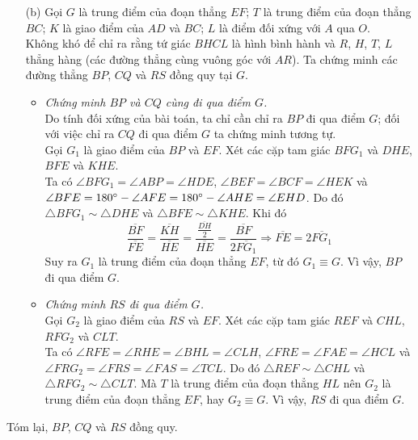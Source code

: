 \begin{solution}
\begin{itemize}
            \item[(b)] Gọi \(G\) là trung điểm của đoạn thẳng \(EF\); \(T\) là trung điểm của đoạn thẳng \(BC\); \(K\) là giao điểm của \(AD\) và \(BC\); \(L\) là điểm đối xứng với \(A\) qua \(O\).\\
            Không khó để chỉ ra rằng tứ giác \(BHCL\) là hình bình hành và \(R\), \(H\), \(T\), \(L\) thẳng hàng (các đường thẳng cùng vuông góc với \(AR\)). Ta chứng minh các đường thẳng \(BP\), \(CQ\) và \(RS\) đồng quy tại \(G\).
            \begin{itemize}
                \item \textit{Chứng minh \(BP\) và \(CQ\) cùng đi qua điểm \(G\).}\\
                Do tính đối xứng của bài toán, ta chỉ cần chỉ ra \(BP\) đi qua điểm \(G\); đối với việc chỉ ra \(CQ\) đi qua điểm \(G\) ta chứng minh tương tự.\\
                Gọi \(G_1\) là giao điểm của \(BP\) và \(EF\). Xét các cặp tam giác \(BFG_1\) và \(DHE\), \(BFE\) và \(KHE\).\\
                Ta có \(\angle BFG_1 = \angle ABP = \angle HDE\), \(\angle BEF = \angle BCF = \angle HEK\) và \(\angle BFE = 180 \degree - \angle AFE = 180 \degree - \angle AHE = \angle EHD\). Do đó \(\triangle BFG_1 \sim \triangle DHE\) và \(\triangle BFE \sim \triangle KHE\). Khi đó
                \[\frac{\overline{BF}}{\overline{FE}} = \frac{\overline{KH}}{\overline{HE}} = \frac{\frac{\overline{DH}}{2}}{\overline{HE}} = \frac{\overline{BF}}{2\overline{FG_1}} \Rightarrow \overline{FE} = 2\overline{FG_1}\]
                Suy ra \(G_1\) là trung điểm của đoạn thẳng \(EF\), từ đó \(G_1 \equiv G\). Vì vậy, \(BP\) đi qua điểm \(G\).
                \item \textit{Chứng minh \(RS\) đi qua điểm \(G\).}\\
                Gọi \(G_2\) là giao điểm của \(RS\) và \(EF\). Xét các cặp tam giác \(REF\) và \(CHL\), \(RFG_2\) và \(CLT\).\\
                Ta có \(\angle RFE = \angle RHE = \angle BHL = \angle CLH\), \(\angle FRE = \angle FAE = \angle HCL\) và \(\angle FRG_2 = \angle FRS = \angle FAS = \angle TCL\). Do đó \(\triangle REF \sim \triangle CHL\) và \(\triangle RFG_2 \sim \triangle CLT\). Mà \(T\) là trung điểm của đoạn thẳng \(HL\) nên \(G_2\) là trung điểm của đoạn thẳng \(EF\), hay \(G_2 \equiv G\). Vì vậy, \(RS\) đi qua điểm \(G\).
            \end{itemize}
        \end{itemize}
        \hspace{0.8cm} Tóm lại, \(BP\), \(CQ\) và \(RS\) đồng quy.
    \end{solution}


